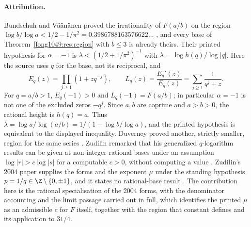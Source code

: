 \paragraph{Attribution.}
Bundschuh and V\"a\"an\"anen proved the irrationality of $F(a/b)$ on the
region $\log b/\log a<1/2-1/\pi^{2}=0.3986788163576622\ldots$
\cite[Thm.~2, p.~177; hypotheses pp.~175--176]{bv1994}, and every base of
Theorem~\ref{long1049:res:region} with $b\le3$ is already theirs.  Their printed
hypothesis for $\alpha=-1$ is $\lambda<(1/2+1/\pi^{2})^{-1}$ with
$\lambda=\log h(q)/\log|q|$. Here the source uses $q$ for the base,
not its reciprocal, and
\[
 E_q(z)=\prod_{j\ge1}(1+zq^{-j}),\qquad
 L_q(z)=\frac{E_q'(z)}{E_q(z)}=\sum_{j\ge1}\frac1{q^j+z}.
\]
For $q=a/b>1$, $E_q(-1)>0$ and $L_q(-1)=F(a/b)$; in particular
$\alpha=-1$ is not one of the excluded zeros $-q^j$.
Since $a,b$ are coprime and $a>b>0$, the rational height is $h(q)=a$.
Thus $\lambda=\log a/\log(a/b)=1/(1-\log b/\log a)$, and the
printed hypothesis is equivalent to the displayed inequality.
Duverney proved another, strictly smaller, region for the same series
\cite[Th\'eor\`eme~2, p.~174]{duverney1996}.  Zudilin remarked that his
generalized $q$-logarithm results can be given at non-integer rational bases
under an assumption $\log|r|>c\log|s|$ for a computable $c>0$, without computing
a value \cite[Sec.~2, p.~4]{zudilin2016}.  Zudilin's 2004 paper supplies the forms and the exponent
$\mu$ under the standing hypothesis $p=1/q\in\Z\mathbin{\backslash}\{0,\pm1\}$, and it
states no rational-base result \cite[Sec.~2, p.~154; Thm.~1]{zudilin2004}.  The
contribution here is the rational specialisation of the 2004 forms, with the
denominator accounting and the limit passage carried out in full, which
identifies the printed $\mu$ as an admissible $c$ for $F$ itself, together with
the region that constant defines and its application to $31/4$.

